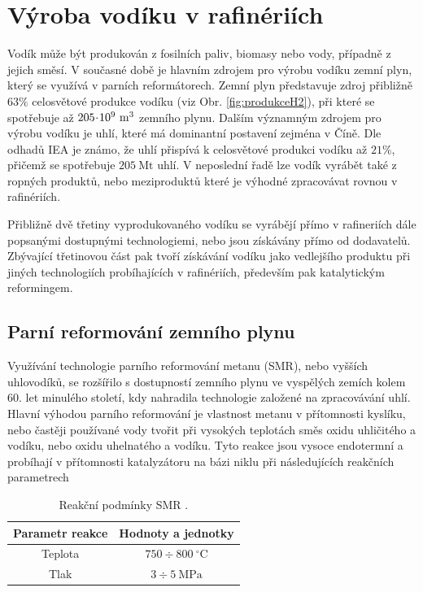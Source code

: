 \chapter{Výroba vodíku v rafinériích}

Vodík může být produkován z fosilních paliv, biomasy nebo vody, případně z jejich směsí. V současné době je hlavním zdrojem pro výrobu vodíku zemní plyn, který se využívá v parních reformátorech. Zemní plyn představuje zdroj přibližně $63\%$ celosvětové produkce vodíku (viz Obr. \ref{fig:produkceH2}), při které se spotřebuje až $205\krat10^{9}\ \mathrm{m^3}$ zemního plynu. Dalším významným zdrojem pro výrobu vodíku je uhlí, které má dominantní postavení zejména v Číně. \cite{Seddon2022}
Dle odhadů \acs{IEA} je známo, že uhlí přispívá k celosvětové produkci vodíku až $21\%$, přičemž se spotřebuje $205\ \mathrm{Mt}$ uhlí. V neposlední řadě lze vodík vyrábět také z ropných produktů, nebo meziproduktů které je výhodné zpracovávat rovnou v rafinériích. \cite{IEAfuture}

Přibližně dvě třetiny vyprodukovaného vodíku se vyrábějí přímo v rafineriích dále popsanými dostupnými technologiemi, nebo jsou získávány přímo od dodavatelů. \cite{IEAfuture} Zbývající třetinovou část pak tvoří získávání vodíku jako vedlejšího produktu při jiných technologiích probíhajících v rafinériích, především pak katalytickým reformingem. \cite{Blazek2006}

\section{Parní reformování zemního plynu}

Využívání technologie parního reformování metanu (\acs{SMR}), nebo vyšších uhlovodíků, se rozšířilo s dostupností zemního plynu ve vyspělých zemích kolem 60. let minulého století, kdy nahradila technologie založené na zpracovávání uhlí. Hlavní výhodou parního reformování je vlastnost metanu v přítomnosti kyslíku, nebo častěji používané vody tvořit při vysokých teplotách směs oxidu uhličitého a vodíku, nebo oxidu uhelnatého a vodíku. \cite{Seddon2022} 
Tyto reakce jsou vysoce endotermní a probíhají v přítomnosti katalyzátoru na bázi niklu při následujících reakčních parametrech
\begin{table}[h]
    \centering
    \begin{tabular}{|c|c|}
        \hline
        \textbf{Parametr reakce} & \textbf{Hodnoty a jednotky} \\ \hline\hline
        Teplota & $750\div800\ \mathrm{^{\circ}C}$ \\ \hline
        Tlak & $3 \div 5\ \mathrm{MPa}$ \\ \hline
    \end{tabular}
    \caption[Reakční podmínky SMR]{Reakční podmínky SMR \cite{Blazek2006}.}
    \label{tab:rp_smr}
\end{table}


